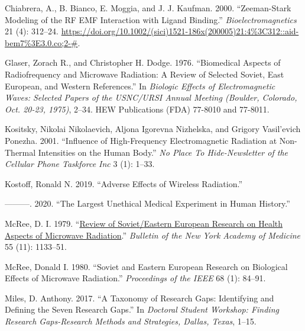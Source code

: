 \documentclass[
  letterpaper,
  DIV=11,
  numbers=noendperiod]{scrreprt}
\newlength{\cslhangindent}
\newlength{\cslentryspacingunit} %
\newenvironment{CSLReferences}[2] %
 {%
  \setlength{\parindent}{0pt}
  \ifodd #1
  \let\oldpar\par
  \def\par{\hangindent=\cslhangindent\oldpar}
  \fi
  \setlength{\parskip}{#2\cslentryspacingunit}
 }%
 {}
\begin{document}
\hypertarget{refs}{}
\begin{CSLReferences}{1}{0}
\leavevmode{}%
Chiabrera, A., B. Bianco, E. Moggia, and J. J. Kaufman. 2000.
{``Zeeman-{Stark} Modeling of the {RF EMF} Interaction with Ligand
Binding.''} \emph{Bioelectromagnetics} 21 (4): 312--24.
\url{https://doi.org/10.1002/(sici)1521-186x(200005)21:4\%3C312::aid-bem7\%3E3.0.co;2-\#}.

\leavevmode{}%
Glaser, Zorach R., and Christopher H. Dodge. 1976. {``Biomedical Aspects
of Radiofrequency and Microwave Radiation: A Review of Selected
{Soviet}, {East European}, and {Western} References.''} In
\emph{Biologic {Effects} of {Electromagnetic Waves}: {Selected Papers}
of the {USNC}/{URSI Annual Meeting} ({Boulder}, {Colorado}, {Oct}.
20-23, 1975)}, 2--34. {HEW Publications (FDA) 77-8010 and 77-8011}.

\leavevmode{}%
Kositsky, Nikolai Nikolaevich, Aljona Igorevna Nizhelska, and Grigory
Vasil'evich Ponezha. 2001. {``Influence of High-Frequency
Electromagnetic Radiation at Non-Thermal Intensities on the Human
Body.''} \emph{No Place To Hide-Newsletter of the Cellular Phone
Taskforce Inc} 3 (1): 1--33.

\leavevmode{}%
Kostoff, Ronald N. 2019. {``Adverse {Effects} of {Wireless
Radiation}.''}

\leavevmode{}%
---------. 2020. {``The {Largest Unethical Medical Experiment} in {Human
History}.''}

\leavevmode{}%
McRee, D. I. 1979.
{``\href{https://www.ncbi.nlm.nih.gov/pmc/articles/PMC1807746}{Review of
{Soviet}/{Eastern European} Research on Health Aspects of Microwave
Radiation}.''} \emph{Bulletin of the New York Academy of Medicine} 55
(11): 1133--51.

\leavevmode{}%
McRee, Donald I. 1980. {``Soviet and {Eastern European} Research on
Biological Effects of Microwave Radiation.''} \emph{Proceedings of the
IEEE} 68 (1): 84--91.

\leavevmode{}%
Miles, D. Anthony. 2017. {``A Taxonomy of Research Gaps: {Identifying}
and Defining the Seven Research Gaps.''} In \emph{Doctoral Student
Workshop: Finding Research Gaps-Research Methods and Strategies,
{Dallas}, {Texas}}, 1--15.

\end{CSLReferences}
\end{document}

